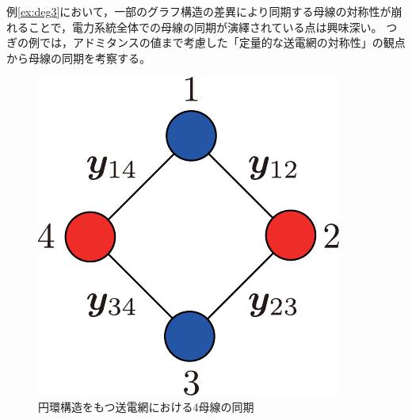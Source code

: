 \documentclass[tombow,dvipdfmx]{corona-a5-1.1}
\begin{document}
例\ref{ex:deg3}において，一部のグラフ構造の差異により同期する母線の対称性が崩れることで，電力系統全体での母線の同期が演繹されている点は興味深い。
つぎの例では，アドミタンスの値まで考慮した「定量的な送電網の対称性」の観点から母線の同期を考察する。

\begin{figure}[t]
\centering
\includegraphics[width = .20\linewidth]{figs/4busbox}
\medskip
\caption{円環構造をもつ送電網における4母線の同期}
\label{fig:4busbox}
\medskip
\end{figure}
\end{document}
